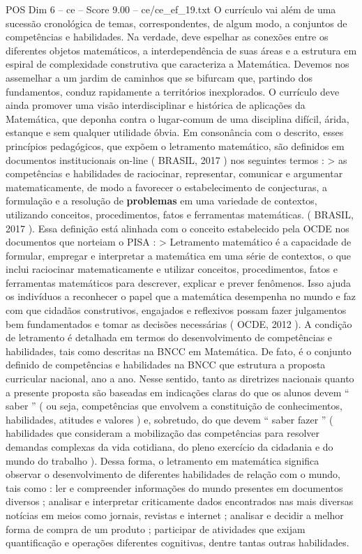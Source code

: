 \begin{textsample}{POS Dim 6 – ce – Score 9.00 – ce/ce\_ef\_19.txt}
O currículo vai além de uma sucessão cronológica de temas, correspondentes, de algum modo, a conjuntos de competências e habilidades.
Na verdade, deve espelhar as conexões entre os diferentes objetos matemáticos, a interdependência de suas áreas e a estrutura em espiral de complexidade construtiva que caracteriza a Matemática.
Devemos nos assemelhar a um jardim de caminhos que se bifurcam que, partindo dos fundamentos, conduz rapidamente a territórios inexplorados.
O currículo deve ainda promover uma visão interdisciplinar e histórica de aplicações da Matemática, que deponha contra o lugar-comum de uma disciplina difícil, árida, estanque e sem qualquer utilidade óbvia.
Em consonância com o descrito, esses princípios pedagógicos, que expõem o letramento matemático, são definidos em documentos institucionais on-line ( BRASIL, 2017 ) nos seguintes termos : > as competências e habilidades de raciocinar, representar, comunicar e argumentar matematicamente, de modo a favorecer o estabelecimento de conjecturas, a formulação e a resolução de \textbf{problemas} em uma variedade de contextos, utilizando conceitos, procedimentos, fatos e ferramentas matemáticas. ( BRASIL, 2017 ).
Essa definição está alinhada com o conceito estabelecido pela OCDE nos documentos que norteiam o PISA : > Letramento matemático é a capacidade de formular, empregar e interpretar a matemática em uma série de contextos, o que inclui raciocinar matematicamente e utilizar conceitos, procedimentos, fatos e ferramentas matemáticos para descrever, explicar e prever fenômenos.
Isso ajuda os indivíduos a reconhecer o papel que a matemática desempenha no mundo e faz com que cidadãos construtivos, engajados e reflexivos possam fazer julgamentos bem fundamentados e tomar as decisões necessárias ( OCDE, 2012 ).
A condição de letramento é detalhada em termos do desenvolvimento de competências e habilidades, tais como descritas na BNCC em Matemática.
De fato, é o conjunto definido de competências e habilidades na BNCC que estrutura a proposta curricular nacional, ano a ano.
Nesse sentido, tanto as diretrizes nacionais quanto a presente proposta são baseadas em indicações claras do que os alunos devem “ saber ” ( ou seja, competências que envolvem a constituição de conhecimentos, habilidades, atitudes e valores ) e, sobretudo, do que devem “ saber fazer ” ( habilidades que consideram a mobilização das competências para resolver demandas complexas da vida cotidiana, do pleno exercício da cidadania e do mundo do trabalho ).
Dessa forma, o letramento em matemática significa observar o desenvolvimento de diferentes habilidades de relação com o mundo, tais como : ler e compreender informações do mundo presentes em documentos diversos ; analisar e interpretar criticamente dados encontrados nas mais diversas notícias em meios como jornais, revistas e internet ; analisar e decidir a melhor forma de compra de um produto ; participar de atividades que exijam quantificação e operações diferentes cognitivas, dentre tantas outras habilidades.

\end{textsample}
